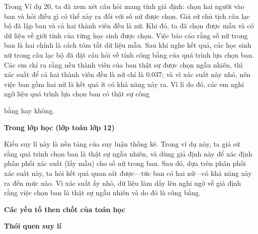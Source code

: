   {
    Trong Ví dụ 20, ta đã xem xét câu hỏi mang tính giả định: chọn hai người vào ban và hỏi điều gì có thể xảy ra đối với số nữ được chọn. Giả sử chủ tịch câu lạc bộ đã lập ban và cả hai thành viên đều là nữ. Khi đó, ta đã chọn được mẫu và có dữ liệu về giới tính của từng học sinh được chọn. Việc báo cáo rằng số nữ trong ban là hai chính là cách tóm tắt dữ liệu mẫu. Sau khi nghe kết quả, các học sinh nữ trong câu lạc bộ đã đặt câu hỏi về tính công bằng của quá trình lựa chọn ban. Các em chỉ ra rằng nếu thành viên của ban thật sự được chọn ngẫu nhiên, thì xác suất để cả hai thành viên đều là nữ chỉ là $0.037$; và vì xác suất này nhỏ, nên việc ban gồm hai nữ là kết quả ít có khả năng xảy ra. Vì lí do đó, các em nghi ngờ liệu quá trình lựa chọn ban có thật sự công\par\vspace{\baselineskip} bằng hay không.

    \textbf{Trong lớp học (lớp toán lớp 12)}\vspace{\baselineskip}

    Kiểu suy lí này là nền tảng của suy luận thống kê. Trong ví dụ này, ta giả sử rằng quá trình chọn ban là thật sự ngẫu nhiên, và dùng giả định này để xác định phân phối xác suất (lấy mẫu) cho số nữ trong ban. Sau đó, dựa trên phân phối xác suất này, ta hỏi kết quả quan sát được---tức ban có hai nữ---có khả năng xảy ra đến mức nào. Vì xác suất ấy nhỏ, dữ liệu làm dấy lên nghi ngờ về giả định rằng việc chọn ban là thật sự ngẫu nhiên và do đó là công bằng.

    \textbf{Các yếu tố then chốt của toán học}

    \begin{hanglist}
    \end{hanglist}

    \textbf{Thói quen suy lí}

    \begin{hanglist}

    \end{hanglist}
  }
